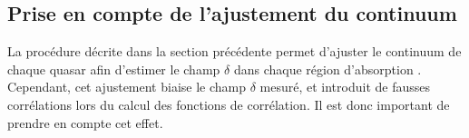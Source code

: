 \documentclass[11pt, twoside, a4paper, openright]{report}
\begin{document}
\subsection{Prise en compte de l'ajustement du continuum}
La procédure décrite dans la section précédente permet d'ajuster le continuum de chaque quasar afin d'estimer le champ $\delta$ dans chaque région d'absorption \lya{}. Cependant, cet ajustement biaise le champ $\delta$ mesuré, et introduit de fausses corrélations lors du calcul des fonctions de corrélation. Il est donc important de prendre en compte cet effet.
\end{document}
